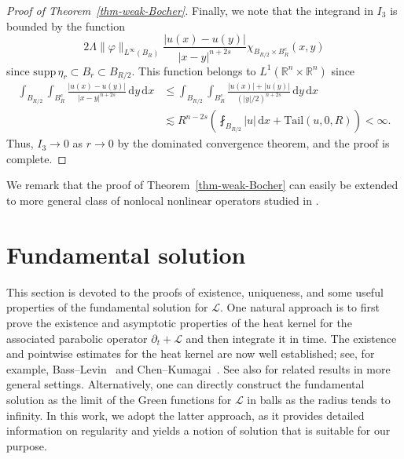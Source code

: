 \documentclass[11pt]{amsart}
\theoremstyle{plain}
\theoremstyle{definition}
\numberwithin{equation}{section}
\begin{document}
\begin{proof}[Proof of Theorem~\ref{thm-weak-Bocher}]
Finally, we note that the integrand in $I_3$ is bounded by the function
\begin{equation*}
    2\Lambda \|\varphi\|_{L^\infty(B_R)} \frac{|u(x)-u(y)|}{|x-y|^{n+2s}} \chi_{B_{R/2} \times B_R^c}(x, y)
\end{equation*}
since $\mathrm{supp}\,\eta_r \subset B_r \subset B_{R/2}$. This function belongs to $L^1(\mathbb{R}^n \times \mathbb{R}^n)$ since
\begin{align*}
    \int_{B_{R/2}} \int_{B_R^c} \frac{|u(x)-u(y)|}{|x-y|^{n+2s}} \,\mathrm{d}y \,\mathrm{d}x
    &\leq \int_{B_{R/2}} \int_{B_R^c} \frac{|u(x)|+|u(y)|}{(|y|/2)^{n+2s}} \,\mathrm{d}y \,\mathrm{d}x \\
    &\lesssim R^{n-2s} \left( \fint_{B_{R/2}} |u| \,\mathrm{d}x + \mathrm{Tail}(u, 0, R) \right) < \infty.
\end{align*}
Thus, $I_3 \to 0$ as $r \to 0$ by the dominated convergence theorem, and the proof is complete.
\end{proof}

We remark that the proof of Theorem~\ref{thm-weak-Bocher} can easily be extended to more general class of nonlocal nonlinear operators studied in \cite{KL24}.

\section{Fundamental solution}\label{sec-fundamentalsol}

This section is devoted to the proofs of existence, uniqueness, and some useful properties of the fundamental solution for $\mathcal{L}$. One natural approach is to first prove the existence and asymptotic properties of the heat kernel for the associated parabolic operator $\partial_t + \mathcal{L}$ and then integrate it in time. The existence and pointwise estimates for the heat kernel are now well established; see, for example, Bass--Levin~\cite{BL02} and Chen--Kumagai~\cite{CK03}. See also \cite{BGK09,CKW21,GHH17,GHH18,GHL14,LW25} for related results in more general settings. Alternatively, one can directly construct the fundamental solution as the limit of the Green functions for $\mathcal{L}$ in balls as the radius tends to infinity. In this work, we adopt the latter approach, as it provides detailed information on regularity and yields a notion of solution that is suitable for our purpose.
\end{document}
